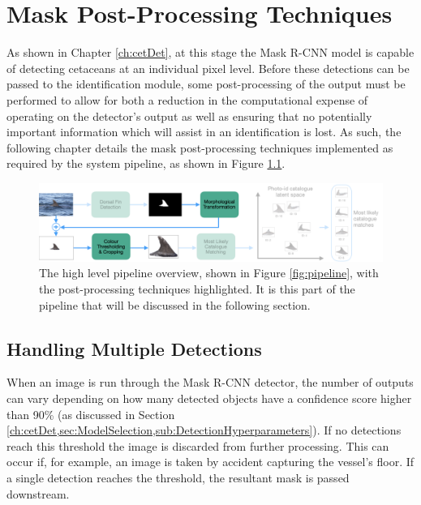 \chapter{Mask Post-Processing Techniques}\label{ch:postProcessing}

As shown in Chapter \ref{ch:cetDet}, at this stage the Mask R-CNN model is capable of detecting cetaceans at an individual pixel level. Before these detections can be passed to the identification module, some post-processing of the output must be performed to allow for both a reduction in the computational expense of operating on the detector's output as well as ensuring that no potentially important information which will assist in an identification is lost. As such, the following chapter details the mask post-processing techniques implemented as required by the system pipeline, as shown in Figure \ref{fig:pipeline-post-processed}.

\begin{figure}[!h]
	\begin{center}
		\includegraphics[width=\linewidth]{Chapter5/figs/pipeline-post-processed.png}
	\end{center}
	\caption[The high level pipeline overview, shown in Figure \ref{fig:pipeline}, with the post-processing techniques highlighted.]{The high level pipeline overview, shown in Figure \ref{fig:pipeline}, with the post-processing techniques highlighted. It is this part of the pipeline that will be discussed in the following section.}
	\label{fig:pipeline-post-processed}
\end{figure}

\section{Handling Multiple Detections}\label{ch:postProcessing,sec:handlingMultipleDetections}

When an image is run through the Mask R-CNN detector, the number of outputs can vary depending on how many detected objects have a confidence score higher than 90\% (as discussed in Section \ref{ch:cetDet,sec:ModelSelection,sub:DetectionHyperparameters}). If no detections reach this threshold the image is discarded from further processing. This can occur if, for example, an image is taken by accident capturing the vessel's floor. If a single detection reaches the threshold, the resultant mask is passed downstream. 


